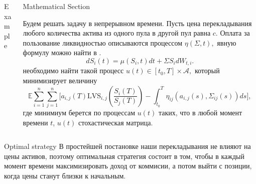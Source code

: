 \documentclass[]{beamer}
\begin{document}
\begin{frame}[t]
\begin{columns}[t]
\begin{column}{\twocolwid}
\begin{columns}[t,totalwidth=\twocolwid]
\begin{column}{\onecolwid}
\begin{block}{Example}
    \end{block}


    
    
    
    \end{column} %
    
    \begin{column}{\onecolwid}\vspace{-.6in} %
    
    
    \begin{block}{Mathematical Section}
    
        Будем решать задачу в непрерывном времени. Пусть цена перекладывания любого количества актива из одного пула в другой пул равна $c$. Оплата за пользование ликвидностью описываются процессом $\eta(\Sigma, t),$ явную формулу можно найти в \cite{Guillermo2021}.
        $$ dS_i(t) = \mu(S_i, t)dt + \Sigma S_i dW_{t,i}.$$
        необходимо найти такой процесс $u(t) \in [t_0, T] \times \mathcal{A},$ который минимизирует величину
        $$ \mathbb{E} \sum_{i = 1}^{n} \sum_{j = 1}^{n} \biggl[ a_{i,j}(T) \text{LVS}_{i,j}( \frac{S_{i}(T)} {S_{j}(T)}) - \int_{t_0}^{T}\eta_{ij}(a_{i,j}(s), \Sigma_{ij}(s))ds \biggr],$$
        где минимиум берется по процессам $u(t)$ таких, что в любой момент времени $t$, $u(t)$ стохастическая матрица. 
    \end{block}


    
    
    \end{column} %
    
    \end{columns} %
    
    
    \begin{alertblock}{Optimal strategy}
        В простейшей постановке наши перекладывания не влияют на цены активов, поэтому оптимальная стратегия состоит в том, чтобы в каждый момент времени максимизировать доход от коммисии, а потом выйти с позиции, когда цены станут близки к начальным.
    \end{alertblock} 
    

\end{column}
\end{columns}
\end{frame}
\end{document}
